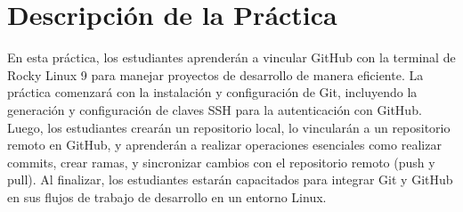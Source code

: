 \section{Descripción de la Práctica}
En esta práctica, los estudiantes aprenderán a vincular GitHub con la terminal de Rocky Linux 9 para manejar proyectos de desarrollo de manera eficiente. La práctica comenzará con la instalación y configuración de Git, incluyendo la generación y configuración de claves SSH para la autenticación con GitHub. Luego, los estudiantes crearán un repositorio local, lo vincularán a un repositorio remoto en GitHub, y aprenderán a realizar operaciones esenciales como realizar commits, crear ramas, y sincronizar cambios con el repositorio remoto (push y pull). Al finalizar, los estudiantes estarán capacitados para integrar Git y GitHub en sus flujos de trabajo de desarrollo en un entorno Linux.